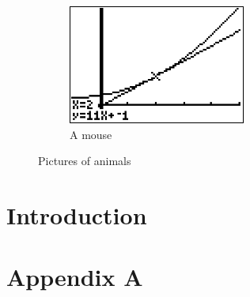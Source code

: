 \documentclass[a4paper, openany, 12pt]{maatext}
\numberwithin{section}{chapter}
\numberwithin{equation}{chapter}
\begin{document}
\begin{figure}
\begin{subfigure}[b]{0.3\textwidth}
        \includegraphics[width=\textwidth]{./assets/20170509-123642.png}
        \caption{A mouse}
        \label{fig:mouse}
    \end{subfigure}
    \caption{Pictures of animals}\label{fig:animals}
\end{figure}

\chapter{Introduction}

%
%

\appendix
\chapter{Appendix A}
\backmatter

\printbibliography

\end{document}
